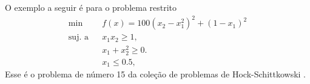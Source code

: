 O exemplo a seguir é para o problema restrito 
\begin{eqnarray*}
  \min & & f(x) = 100(x_2 - x_1^2)^2 + (1 - x_1)^2 \\
  \mbox{suj. a} & & x_1x_2 \geq 1, \\
                & & x_1 + x_2^2 \geq 0. \\
                & & x_1 \leq 0.5,
\end{eqnarray*}
Esse é o problema de número 15 da coleção de problemas de Hock-Schittkowski
\cite{bib:hs}.




